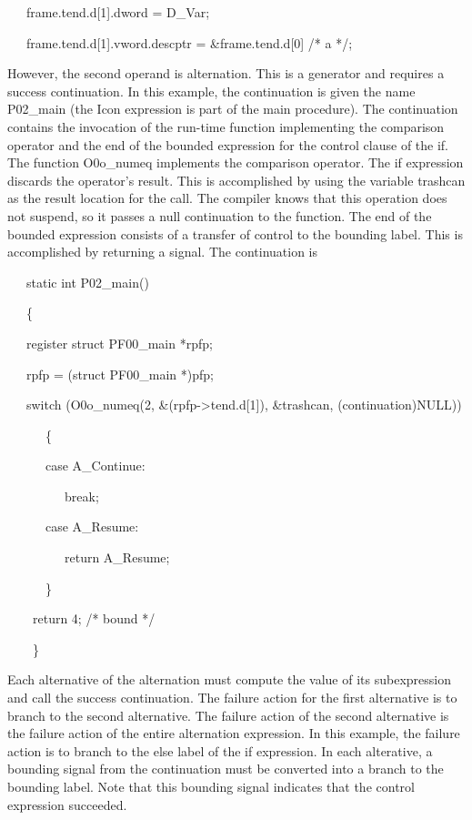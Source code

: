 {\ttfamily\mdseries
\ \ \ frame.tend.d[1].dword = D\_Var;}

{\ttfamily\mdseries
\ \ \ frame.tend.d[1].vword.descptr = \&frame.tend.d[0] /* a */;}

However, the second operand is alternation. This is a generator and
requires a success continuation. In this example, the continuation is
given the name P02\_main (the Icon expression is part of the main
procedure). The continuation contains the invocation of the run-time
function implementing the comparison operator and the end of the
bounded expression for the control clause of the if. The function
O0o\_numeq implements the comparison operator. The if expression
discards the operator's result. This is accomplished by using the
variable trashcan as the result location for the call. The compiler
knows that this operation does not suspend, so it passes a null
continuation to the function. The end of the bounded expression
consists of a transfer of control to the bounding label. This is
accomplished by returning a signal. The continuation is

{\ttfamily\mdseries
\ \ \ static int P02\_main()}

{\ttfamily\mdseries
\ \ \ \{}

{\ttfamily\mdseries
\ \ \ register struct PF00\_main *rpfp;}


\bigskip

{\ttfamily\mdseries
\ \ \ rpfp = (struct PF00\_main *)pfp;}

{\ttfamily\mdseries
\ \ \ switch (O0o\_numeq(2, \&(rpfp-{\textgreater}tend.d[1]), \&trashcan, (continuation)NULL))}

{\ttfamily\mdseries
\ \ \ \ \ \ \{}

{\ttfamily\mdseries
\ \ \ \ \ \ case A\_Continue:}

{\ttfamily\mdseries
\ \ \ \ \ \ \ \ \ break;}

{\ttfamily\mdseries
\ \ \ \ \ \ case A\_Resume:}

{\ttfamily\mdseries
\ \ \ \ \ \ \ \ \ return A\_Resume;}

{\ttfamily\mdseries
\ \ \ \ \ \ \}}

{\ttfamily\mdseries
\ \ \ \ return 4; /* bound */}

{\ttfamily\mdseries
\ \ \ \ \}}


Each alternative of the alternation must compute the value of its
subexpression and call the success continuation. The failure action
for the first alternative is to branch to the second alternative. The
failure action of the second alternative is the failure action of the
entire alternation expression. In this example, the failure action is
to branch to the else label of the if expression. In each alterative,
a bounding signal from the continuation must be converted into a
branch to the bounding label. Note that this bounding signal indicates
that the control expression succeeded.

